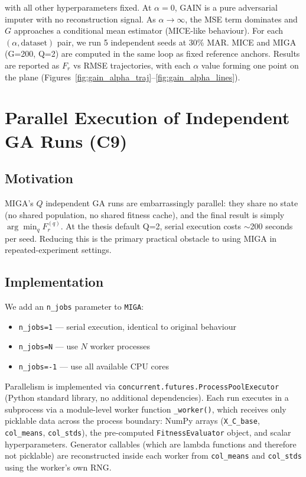 with all other hyperparameters fixed. At $\alpha = 0$, GAIN is a pure adversarial imputer with no reconstruction signal. As $\alpha \to \infty$, the MSE term dominates and $G$ approaches a conditional mean estimator (MICE-like behaviour). For each $(\alpha, \text{dataset})$ pair, we run 5 independent seeds at 30\% MAR. MICE and MIGA (G=200, Q=2) are computed in the same loop as fixed reference anchors. Results are reported as $F_r$ vs RMSE trajectories, with each $\alpha$ value forming one point on the plane (Figures~\ref{fig:gain_alpha_traj}--\ref{fig:gain_alpha_lines}).


\section{Parallel Execution of Independent GA Runs (C9)}
\label{sec:parallel_impl}

\subsection{Motivation}

MIGA's $Q$ independent GA runs are embarrassingly parallel: they share no state (no shared population, no shared fitness cache), and the final result is simply $\arg\min_{q} F_r^{(q)}$. At the thesis default Q=2, serial execution costs $\sim$200 seconds per seed. Reducing this is the primary practical obstacle to using MIGA in repeated-experiment settings.

\subsection{Implementation}

We add an \texttt{n\_jobs} parameter to \texttt{MIGA}:
\begin{itemize}
    \item \texttt{n\_jobs=1} — serial execution, identical to original behaviour
    \item \texttt{n\_jobs=N} — use $N$ worker processes
    \item \texttt{n\_jobs=-1} — use all available CPU cores
\end{itemize}

Parallelism is implemented via \texttt{concurrent.futures.ProcessPoolExecutor} (Python standard library, no additional dependencies). Each run executes in a subprocess via a module-level worker function \texttt{\_worker()}, which receives only picklable data across the process boundary: NumPy arrays (\texttt{X\_C\_base}, \texttt{col\_means}, \texttt{col\_stds}), the pre-computed \texttt{FitnessEvaluator} object, and scalar hyperparameters. Generator callables (which are lambda functions and therefore not picklable) are reconstructed inside each worker from \texttt{col\_means} and \texttt{col\_stds} using the worker's own RNG.

